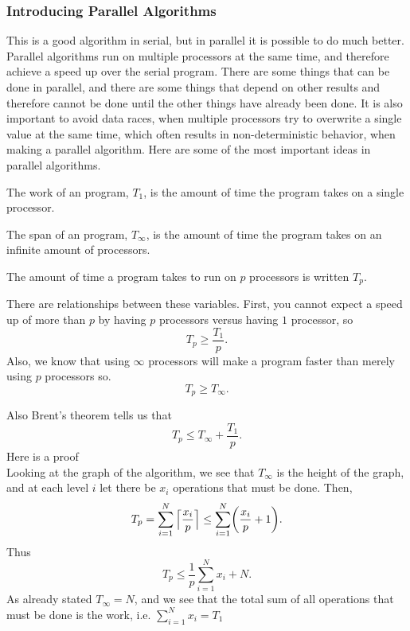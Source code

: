 \documentclass{beamer}
\DeclarePairedDelimiter{\paren}{(}{)}
\begin{document}
\begin{frame}
\frametitle{Introducing Parallel Algorithms}
	This is a good algorithm in serial, but in parallel it is possible to do much better. Parallel algorithms run on multiple processors at the same time, and therefore achieve a speed up over the serial program. There are some things that can be done in parallel, and there are some things that depend on other results and therefore cannot be done until the other things have already been done. It is also important to avoid data races, when multiple processors try to overwrite a single value at the same time, which often results in non-deterministic behavior, when making a parallel algorithm. Here are some of the most important ideas in parallel algorithms.
\end{frame}
\begin{frame}
\begin{definition}
	The work of an program, $T_1$, is the amount of time the program takes on a single processor. 
\end{definition}
\begin{definition}
	The span of an program, $T_\infty$, is the amount of time the program takes on an infinite amount of processors. 
\end{definition}
\begin{definition}
	The amount of time a program takes to run on $p$ processors is written $T_p$.
\end{definition}
There are relationships between these variables. First, you cannot expect a speed up of more than $p$ by having $p$ processors versus having $1$ processor, so 
$$T_p \geq \frac{T_1}{p}.$$
Also, we know that using $\infty$ processors will make a program faster than merely using $p$ processors so.
$$T_p \geq T_\infty.$$
\end{frame}

\begin{frame}
Also Brent's theorem tells us that 
$$T_p \leq T_\infty + \frac{T_1}{p}.$$
Here is a proof\\
Looking at the graph of the algorithm, we see that $T_\infty$ is the height of the graph, and at each level $i$ let there be $x_i$ operations that must be done.
Then, 
$$T_p = \sum_{i=1}^{N}\Big\lceil{\frac{x_i}{p}}\Big\rceil \leq \sum_{i=1}^{N} \paren*{\frac{x_i}{p} + 1}.$$
Thus
$$T_p  \leq \frac{1}{p}\sum_{i=1}^{N}x_i + N.$$
As already stated $T_\infty = N$, and we see that the total sum of all operations that must be done is the work, i.e. $\sum_{i=1}^{N}x_i = T_1$
\end{frame}
 
\end{document}
